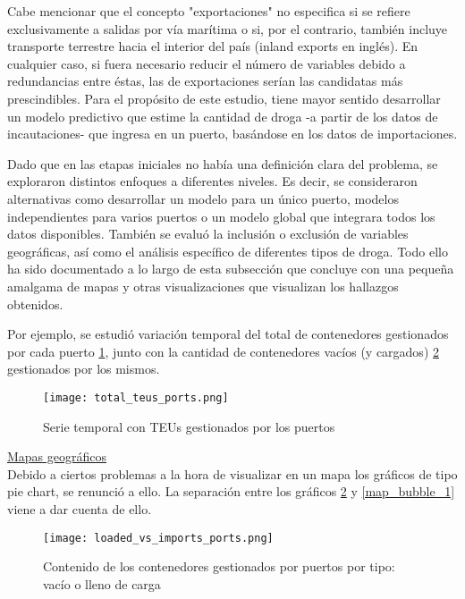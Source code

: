 \documentclass[12pt]{article}
\begin{document}
		Cabe mencionar que el concepto "exportaciones" no especifica si se refiere exclusivamente a salidas por vía marítima o si, por el contrario, también incluye transporte terrestre hacia el interior del país (inland exports en inglés). En cualquier caso, si fuera necesario reducir el número de variables debido a redundancias entre éstas, las de exportaciones serían las candidatas más prescindibles. Para el propósito de este estudio, tiene mayor sentido desarrollar un modelo predictivo que estime la cantidad de droga -a partir de los datos de incautaciones- que ingresa en un puerto, basándose en los datos de importaciones.
		
		
		Dado que en las etapas iniciales no había una definición clara del problema, se exploraron distintos enfoques a diferentes niveles. Es decir, se consideraron alternativas como desarrollar un modelo para un único puerto, modelos independientes para varios puertos o un modelo global que integrara todos los datos disponibles. También se evaluó la inclusión o exclusión de variables geográficas, así como el análisis específico de diferentes tipos de droga. Todo ello ha sido documentado a lo largo de esta subsección que concluye con una pequeña amalgama de mapas y otras visualizaciones que visualizan los hallazgos obtenidos.
		
		Por ejemplo, se estudió variación temporal del total de contenedores gestionados por cada puerto \ref{total_teus_ports}, junto con la cantidad de contenedores vacíos (y cargados) \ref{loaded_vs_imports_ports} gestionados por los mismos.
		
		\begin{figure}[H]
			\caption{\label{total_teus_ports} Serie temporal con TEUs gestionados por los puertos}
			\centering
			\hspace*{1cm}
			\texttt{[image: total\_teus\_ports.png]}
		\end{figure}
		
		
		\underline{Mapas geográficos}\\
		Debido a ciertos problemas a la hora de visualizar en un mapa los gráficos de tipo pie chart, se renunció a ello. La separación entre los gráficos \ref{loaded_vs_imports_ports} y \ref{map_bubble_1} viene a dar cuenta de ello.
		
		\begin{figure}[H]
			\caption{\label{loaded_vs_imports_ports} Contenido de los contenedores gestionados por puertos por tipo: vacío o lleno de carga}
			\centering
			\hspace*{1cm}
			\texttt{[image: loaded\_vs\_imports\_ports.png]}
		\end{figure}
	
\end{document}
